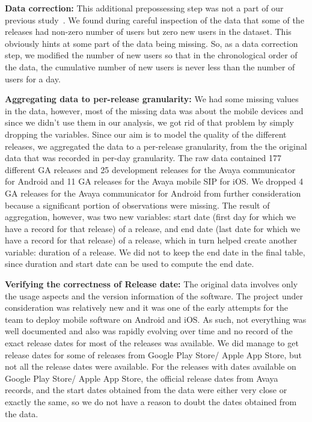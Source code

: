\documentclass[smallcondensed]{svjour3}     %
\begin{document}
\noindent
\textbf{Data correction:}
This additional prepossessing step was not a part of our previous study~\cite{dey2018modeling}.
We found during careful inspection of the data that some of the releases had non-zero number
of users but zero new users in the dataset. This obviously hints at some part of the data 
being missing. So, as a data correction step, we modified the number of new users so that 
in the chronological order of the data, the cumulative number of new users is never 
less than the number of users for a day.

\noindent
\textbf{Aggregating data to per-release granularity:}
We had some missing values in the data, however, most of the missing data was about the
mobile devices and since we didn't use them in our analysis, we got rid of that
problem by simply dropping the variables. Since our aim is to model the quality of the
different releases, we aggregated the data to a per-release 
granularity, from the the original data that was recorded in per-day granularity. 
The raw data contained 177 different GA releases and 25 development releases for the 
Avaya communicator for Android and 11 GA releases for the Avaya mobile SIP for iOS. 
We dropped 4 GA releases for the Avaya communicator for Android from further 
consideration because a significant
portion of observations were missing. The result of aggregation, however,
was two new variables: start date (first day for which we have a
record for that release) of a release, and end date (last date for
which we have a record for that release) of a release, which in turn
helped create another variable: duration of a release. We did
not to keep the end date in the final table, since duration and
start date can be used to compute the end date.

\noindent
\textbf{Verifying the correctness of Release date:}
The original data involves only the usage aspects and the version
information of the software. The project under consideration was
relatively new and it was one of the early attempts for the team to deploy
mobile software on Android and iOS. As such, not everything
was well documented and also was rapidly evolving over time  and no
record of the exact release dates for most of the releases was
available. We did manage to get release dates for some of releases
from Google Play Store/ Apple App Store, but not all the release dates  were
available.  For the releases with dates available on Google Play
Store/ Apple App Store, the official release dates from Avaya records, and the start
dates obtained from the data were either very close or exactly the
same, so we do not have a reason to doubt the dates obtained from the
data. 
\end{document}
